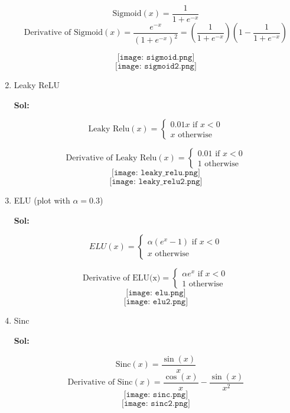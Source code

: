 \documentclass[11pt]{article}
\begin{document}
\begin{enumerate}
    \[\text{Sigmoid}(x) = \frac{1}{1+e^{-x}}\]
    \[\text{Derivative of Sigmoid}(x) = \frac{e^{-x}}{(1 + e^{-x})^2} = (\frac{1}{1+e^{-x}})(1 - \frac{1}{1+e^{-x}})\]
    
    \[\texttt{[image: sigmoid.png]}\]
    \[\texttt{[image: sigmoid2.png]}\]
  \newpage
  
    \item Leaky ReLU
    
    \textbf{Sol:}

    \[\text{Leaky Relu}(x) = \begin{cases}
      0.01x \text{ if } x < 0\\
      x \text{ otherwise }
    \end{cases}\]

    \[\text{Derivative of Leaky Relu}(x) = \begin{cases}
      0.01 \text{ if } x < 0\\
      1 \text{ otherwise }
    \end{cases}\]
    \[\texttt{[image: leaky\_relu.png]}\]
    \[\texttt{[image: leaky\_relu2.png]}\]
  \newpage
    \item ELU (plot with $\alpha=0.3$)
    
    \textbf{Sol:}

    \[ELU(x) = \begin{cases}
      \alpha(e^x - 1) \text{ if } x < 0\\ 
      x \text{ otherwise }
    \end{cases}\]

    \[\text{Derivative of ELU(x)} = \begin{cases}
      \alpha e^x \text{ if } x < 0\\
      1 \text{ otherwise }
    \end{cases}\]
    \[\texttt{[image: elu.png]}\]
    \[\texttt{[image: elu2.png]}\]
  
  \newpage
    \item Sinc
    
    \textbf{Sol:}

    \[\text{Sinc}(x) = \frac{\sin(x)}{x}\]
    \[\text{Derivative of Sinc}(x) = \frac{\cos(x)}{x} - \frac{\sin(x)}{x^2}\]
    \[\texttt{[image: sinc.png]}\]
    \[\texttt{[image: sinc2.png]}\]
\end{enumerate}

\vspace{20pt}
\end{document}

